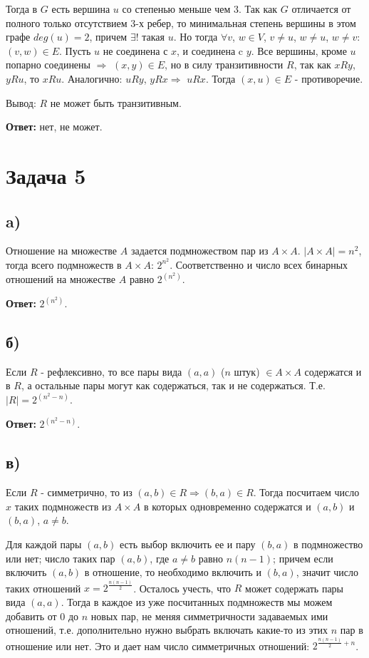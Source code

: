 \documentclass{article}
\begin{document}
	Тогда в $G$ есть вершина $u$ со степенью меньше чем 3. Так как $G$ отличается от полного только отсутствием 3-х ребер, то минимальная степень вершины в этом графе $deg(u) = 2$, причем $\exists!$ такая $u$. Но тогда $\forall v$, $w \in V$, $v \ne u$, $w \ne u$, $w \ne v$: $(v, w) \in E$. Пусть $u$ не соединена с $x$, и соединена c $y$. Все вершины, кроме $u$ попарно соединены $\Rightarrow$ $(x, y) \in E$, но в силу транзитивности $R$, так как $x R y$, $y R u$, то $x R u$. Аналогично: $u R y$, $y R x \Rightarrow$ $u R x$. Тогда $(x, u) \in E$ - противоречие.
	
	Вывод: $R$ не может быть транзитивным.
	
	\textbf{Ответ:} нет, не может.
	
	\section {Задача 5} 
	
	\subsection {a)}
	 Отношение на множестве $A$ задается подмножеством пар из $ A \times A$. $|A \times A| = n^2 $, тогда всего подмножеств в $A \times A$: $2^{n^2}$. Соответственно и число всех бинарных отношений на множестве $A$ равно $2^{(n^2)}$.
	 
	 \textbf{Ответ:} $2^{(n^2)}$. 
	 
	 \subsection {б)}
	 Если $R$ - рефлексивно, то все пары вида $(a, a) $ ($n$ штук) $ \in A \times A$ содержатся и в $R$, а остальные пары могут как содержаться, так и не содержаться. Т.е. $|R| = 2^{(n^2 - n)}$.
	 
	 \textbf{Ответ:} $2^{(n^2 - n)}$.
	  
	\subsection {в)}
	Если $R$ - симметрично, то из $(a, b) \in R \Rightarrow (b, a) \in R$. Тогда посчитаем число $x$ таких подмножеств из $A \times A$ в которых одновременно содержатся и $(a, b)$ и $(b, a)$, $a \ne b$. 
	
	Для каждой пары $(a, b)$ есть выбор включить ее и пару $(b, a)$ в подмножество или нет; число таких пар $(a, b)$, где $a \ne b$ равно $n(n - 1)$; причем если включить $(a, b)$ в отношение, то необходимо включить и $(b, a)$, значит число таких отношений $x = 2^{\frac{n(n - 1)} {2}}$. Осталось учесть, что $R$ может содержать пары вида $(a, a)$. Тогда в каждое из уже посчитанных подмножеств мы можем добавить от $0$ до $n$ новых пар, не меняя симметричности задаваемых ими отношений, т.е. дополнительно нужно выбрать включать какие-то из этих $n$ пар в отношение или нет. Это и дает нам число симметричных отношений: $2^{\frac{n(n - 1)} {2} + n}$.
		
\end{document}
